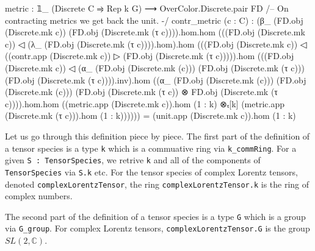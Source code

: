 \documentclass[a4paper, 11pt]{article}
\begin{document}
\begin{codeLong}
  metric : 𝟙_ (Discrete C ⥤ Rep k G) ⟶ OverColor.Discrete.pair FD
  /-- On contracting metrics we get back the unit. -/
  contr_metric (c : C) :
    (β_ (FD.obj (Discrete.mk c)) (FD.obj (Discrete.mk (τ c)))).hom.hom
    (((FD.obj (Discrete.mk c)) ◁ (λ_ (FD.obj (Discrete.mk (τ c)))).hom).hom
    (((FD.obj (Discrete.mk c)) ◁ ((contr.app (Discrete.mk c)) ▷
    (FD.obj (Discrete.mk (τ c))))).hom
    (((FD.obj (Discrete.mk c)) ◁ (α_ (FD.obj (Discrete.mk (c)))
      (FD.obj (Discrete.mk (τ c))) (FD.obj (Discrete.mk (τ c)))).inv).hom
    ((α_ (FD.obj (Discrete.mk (c))) (FD.obj (Discrete.mk (c)))
      (FD.obj (Discrete.mk (τ c)) ⊗ FD.obj (Discrete.mk (τ c)))).hom.hom
    ((metric.app (Discrete.mk c)).hom (1 : k) ⊗ₜ[k]
      (metric.app (Discrete.mk (τ c))).hom (1 : k))))))
    = (unit.app (Discrete.mk c)).hom (1 : k)
\end{codeLong}

Let us go through this definition piece by piece.
The first part of the definition of a tensor species is a type \lstinline|k| 
which is a commuative ring via \lstinline|k_commRing|. 
For a given \lstinline|S : TensorSpecies|, we retrive \lstinline|k| and all of the 
components of \lstinline|TensorSpecies| via \lstinline|S.k| etc. 
For the tensor species of complex Lorentz tensors, denoted 
\lstinline|complexLorentzTensor|, the ring \lstinline|complexLorentzTensor.k| is the ring of complex numbers.

The second part of the definition of a tensor species is a type \lstinline|G| 
which is a group via \lstinline|G_group|. For complex Lorentz tensors, 
\lstinline|complexLorentzTensor.G| is the group $SL(2, \mathbb{C})$.
\end{document}

